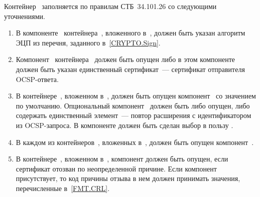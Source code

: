 Контейнер~ заполняется по правилам СТБ~34.101.26
со следующими уточнениями.

\begin{enumerate}
\item
В компоненте~ контейнера~,
вложенного  в~, должен быть указан алгоритм ЭЦП из перечня,
заданного в~\ref{CRYPTO.Sign}.

\item
Компонент~ контейнера~ должен быть опущен
либо в этом компоненте должен быть указан единственный сертификат~--- сертификат
отправителя OCSP-ответа.

\item
В контейнере~, вложенном в~, должен
быть опущен компонент~ со значением по умолчанию. Опциональный
компонент~ должен быть либо опущен, либо содержать
единственный элемент~--- повтор расширения с идентификатором
 из OCSP-запроса.
%
В компоненте  должен быть сделан выбор в пользу .

\item
В каждом из контейнеров~, вложенных в~,
должен быть опущен компонент~.

\item
В контейнере~, вложенном в~,
компонент  должен быть опущен, если сертификат отозван 
по неопределенной причине. Если компонент  присутствует, 
то код причины отзыва в нем должен принимать значения, перечисленные 
в~\ref{FMT.CRL}.
\end{enumerate}
